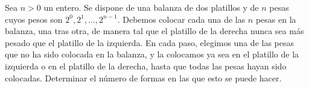 Sea $n > 0$ un entero. Se dispone de una balanza de dos platillos y de $n$ pesas cuyos pesos son $2^0, 2^1, \dots , 2^{n−1}$. Debemos colocar cada una de las $n$ pesas en la balanza, una tras otra, de manera tal que el platillo de la derecha nunca sea más pesado que el platillo de la izquierda. En cada paso, elegimos una de las pesas que no ha sido colocada en la balanza, y la colocamos ya sea en el platillo de la izquierda o en el platillo de la derecha, hasta que todas las pesas hayan sido colocadas. Determinar el número de formas en las que esto se puede hacer.
